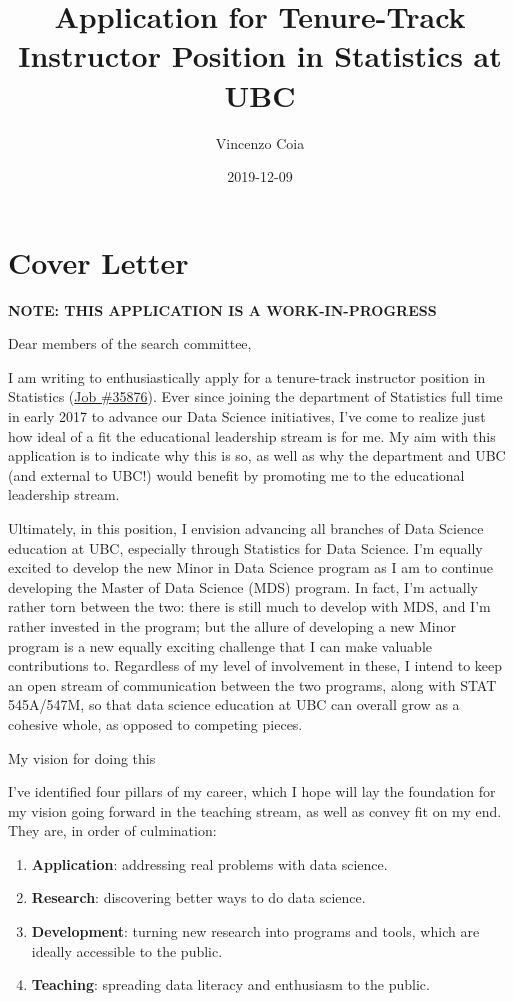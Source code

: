 \documentclass[]{book}
\title{Application for Tenure-Track Instructor Position in Statistics at UBC}
\author{Vincenzo Coia}
\date{2019-12-09}
\begin{document}
\maketitle

{
\setcounter{tocdepth}{1}
\tableofcontents
}
\hypertarget{cover-letter}{%
\chapter{Cover Letter}\label{cover-letter}}

\textbf{NOTE: THIS APPLICATION IS A WORK-IN-PROGRESS}

Dear members of the search committee,

I am writing to enthusiastically apply for a tenure-track instructor position in Statistics (\href{https://www.stat.ubc.ca/three-tenure-track-instructor-positions-statistics-35876}{Job \#35876}). Ever since joining the department of Statistics full time in early 2017 to advance our Data Science initiatives, I've come to realize just how ideal of a fit the educational leadership stream is for me. My aim with this application is to indicate why this is so, as well as why the department and UBC (and external to UBC!) would benefit by promoting me to the educational leadership stream.

Ultimately, in this position, I envision advancing all branches of Data Science education at UBC, especially through Statistics for Data Science. I'm equally excited to develop the new Minor in Data Science program as I am to continue developing the Master of Data Science (MDS) program. In fact, I'm actually rather torn between the two: there is still much to develop with MDS, and I'm rather invested in the program; but the allure of developing a new Minor program is a new equally exciting challenge that I can make valuable contributions to. Regardless of my level of involvement in these, I intend to keep an open stream of communication between the two programs, along with STAT 545A/547M, so that data science education at UBC can overall grow as a cohesive whole, as opposed to competing pieces.

My vision for doing this

I've identified four pillars of my career, which I hope will lay the foundation for my vision going forward in the teaching stream, as well as convey fit on my end. They are, in order of culmination:

\begin{enumerate}
\def\labelenumi{\arabic{enumi}.}
\item
  \textbf{Application}: addressing real problems with data science.
\item
  \textbf{Research}: discovering better ways to do data science.
\item
  \textbf{Development}: turning new research into programs and tools, which are ideally accessible to the public.
\item
  \textbf{Teaching}: spreading data literacy and enthusiasm to the public.
\end{enumerate}
\end{document}
